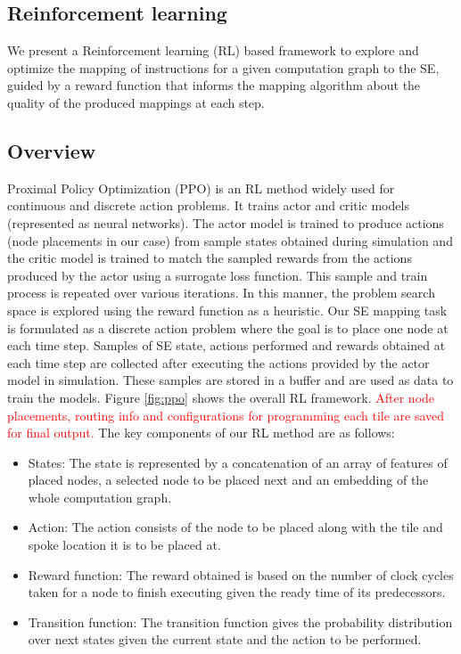 \subsection{Reinforcement learning}

We present a Reinforcement learning (RL) based framework to explore and optimize the mapping of instructions for a given computation graph to the SE, guided by a reward function that informs the mapping algorithm about the quality of the produced mappings at each step. 

\subsection{Overview}
Proximal Policy Optimization (PPO) is an RL method widely used for continuous and discrete action problems. It trains actor and critic models (represented as neural networks).
The actor model is trained to produce actions (node placements in our case) from sample states obtained during simulation and the critic model is trained to match the sampled rewards from the actions produced by the actor using a surrogate loss function. This sample and train process is repeated over various iterations. In this manner, the problem search space is explored using the reward function as a heuristic.
Our SE mapping task is formulated as a discrete action problem where the goal is to place one node at each time step. Samples of SE state, actions performed and rewards obtained at each time step are collected after executing the actions provided by the actor model in simulation. These samples are stored in a buffer and are used as data to train the models.
Figure \ref{fig:ppo} shows the overall RL framework. 
\textcolor{red}{After node placements, routing info and configurations for programming each tile are saved for final output.}
The key components of our RL method are as follows:
\begin{itemize}
  \item States: The state is represented by a concatenation of an array of features of placed nodes, a selected node to be placed next and an embedding of the whole computation graph. 
  \item Action: The action consists of the node to be placed along with the tile and spoke location it is to be placed at.
  \item Reward function: The reward obtained is based on the number of clock cycles taken for a node to finish executing given the ready time of its predecessors.
  \item Transition function: The transition function gives the probability distribution over next states given the current state and the action to be performed.
\end{itemize}



